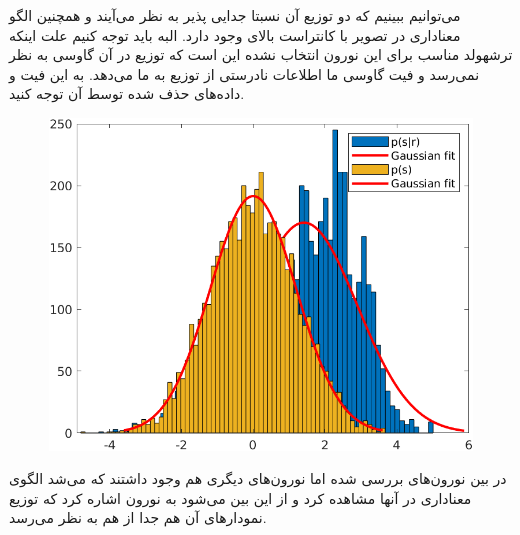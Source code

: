 \documentclass[12pt,onecolumn,a4paper,fleqn]{article}
\begin{document}
	
 \begin{figure}[ht]
 	\centering
 	\hfill
 \end{figure}

می‌توانیم ببینیم که دو توزیع آن نسبتا جدایی پذیر به نظر می‌آیند و همچنین الگو معناداری در تصویر با کانتراست بالای  وجود دارد. البه باید توجه کنیم علت اینکه ترشهولد مناسب برای این نورون انتخاب نشده این است که توزیع  در آن گاوسی به نظر نمی‌رسد و فیت گاوسی ما اطلاعات نادرستی از توزیع به ما می‌دهد. به این فیت و داده‌های حذف شده توسط آن توجه کنید.
	 \begin{figure}[ht]
		\centering
		\includegraphics[width=0.4\linewidth]{photos/STA/gaussianFits/37.png}
	\end{figure}

در بین نورون‌های بررسی شده اما نورون‌های دیگری هم وجود داشتند که می‌شد الگوی معنا‌داری در  آنها مشاهده کرد و از این بین می‌شود به نورون	 اشاره کرد که توزیع‌ نمودار‌های آن هم جدا از هم به نظر می‌رسد.
\end{document}
